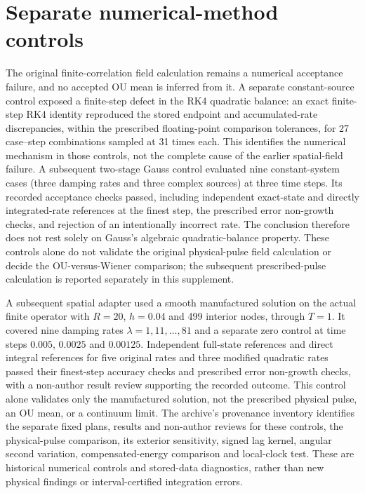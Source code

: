 \section{Separate numerical-method controls}\label{app:method-controls}
The original finite-correlation field calculation remains a numerical
acceptance failure, and no accepted OU mean is inferred from it. A separate
constant-source control exposed a finite-step defect in the RK4 quadratic
balance: an exact finite-step RK4 identity reproduced the stored endpoint and
accumulated-rate discrepancies, within the prescribed floating-point
comparison tolerances, for 27 case--step combinations sampled at 31 times
each. This identifies the numerical mechanism in those controls, not the
complete cause of the earlier spatial-field failure. A subsequent two-stage
Gauss control evaluated nine constant-system cases (three damping rates and
three complex sources) at three time steps. Its recorded acceptance checks
passed, including independent exact-state and directly integrated-rate
references at the finest step, the prescribed error non-growth checks, and
rejection of an intentionally incorrect rate. The conclusion therefore does
not rest solely on Gauss's algebraic quadratic-balance property. These
controls alone do not validate the original physical-pulse field calculation
or decide the OU-versus-Wiener comparison; the subsequent prescribed-pulse
calculation is reported separately in this supplement.

A subsequent spatial adapter used a smooth manufactured solution on the actual
finite operator with $R=20$, $h=0.04$ and 499 interior nodes, through $T=1$.
It covered nine damping rates $\lambda=1,11,\ldots,81$ and a separate zero
control at time steps $0.005$, $0.0025$ and $0.00125$.
Independent full-state references and direct integral references for five
original rates and three modified quadratic rates passed their finest-step
accuracy checks and prescribed error non-growth checks, with a non-author
result review supporting the recorded outcome.
This control alone validates only the manufactured solution, not the prescribed
physical pulse, an OU mean, or a continuum limit.
The archive's provenance inventory identifies the separate fixed plans,
results and non-author reviews for these controls, the physical-pulse
comparison, its exterior sensitivity, signed lag kernel, angular second
variation, compensated-energy comparison and local-clock test. These are
historical numerical controls and stored-data diagnostics, rather than
new physical findings or interval-certified integration errors.
